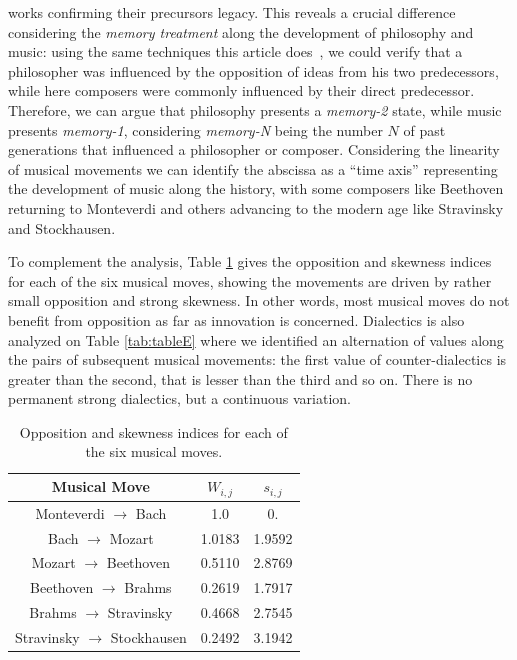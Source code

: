 \documentclass[
 aip,
 jmp,
 amsmath,amssymb,
 reprint,
]{revtex4-1}
\begin{document}
works confirming their precursors legacy. This reveals a crucial difference
considering the \textit{memory treatment} along the development of
philosophy and music: using the same techniques this article does~\cite{Fabbri},
we could verify that a philosopher was influenced by the
opposition of ideas from his two predecessors, while here composers were commonly
influenced by their direct predecessor. Therefore, we can argue that philosophy
presents a \textit{memory-2} state, while music presents
\textit{memory-1}, considering \textit{memory-N} being the number $N$
of past generations that influenced a philosopher or
composer. Considering the linearity of musical movements we can
identify the abscissa as a ``time axis'' representing the development
of music along the history, with some composers
like Beethoven returning to Monteverdi and others advancing to the
modern age like Stravinsky and Stockhausen.

To complement the analysis, Table \ref{tab:tableOI} gives the
opposition and skewness indices for each of the six musical moves,
showing the movements are driven by rather small opposition and strong
skewness. In other words, most musical moves do not benefit from
opposition as far as innovation is concerned. Dialectics is also analyzed on Table
\ref{tab:tableE} where we identified an alternation of values along
the pairs of subsequent musical movements: the first value of
counter-dialectics is greater than the second, that is lesser than the
third and so on. There is no permanent strong
dialectics, but a continuous variation.

\begin{table}[ht]
\caption{\label{tab:tableOI}Opposition and skewness indices for each
of the six musical moves.}

\begin{tabular}{|c||c|c|}
\hline
Musical Move & $W_{i,j}$ & $s_{i,j}$ \\
\hline \hline

 Monteverdi $\to$ Bach             &   1.0     &  0.      \\
 Bach $\to$ Mozart                 &   1.0183  &  1.9592  \\
 Mozart $\to$ Beethoven            &   0.5110  &  2.8769  \\
 Beethoven $\to$ Brahms            &   0.2619  &  1.7917  \\
 Brahms $\to$ Stravinsky           &   0.4668  &  2.7545  \\
 Stravinsky $\to$ Stockhausen      &   0.2492  &  3.1942  \\

\hline
\end{tabular}
\end{table}
\end{document}
